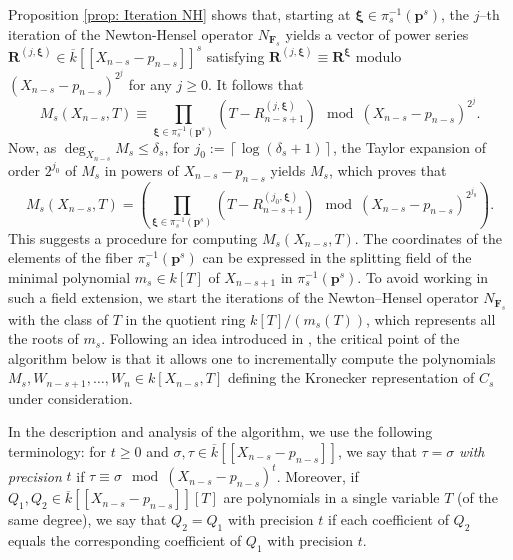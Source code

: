 \documentclass[pdflatex,sn-basic]{sn-jnl}%
\theoremstyle{thmstyleone}%
\theoremstyle{thmstyletwo}%
\theoremstyle{thmstylethree}%
\theoremstyle{definition}
\numberwithin{equation}{section}
\newcommand{\bfs}{\boldsymbol}
\begin{document}
Proposition \ref{prop: Iteration NH} shows that, starting at
$\bfs\xi \in \pi_s^{-1}(\bfs p^s)$, the $j$--th iteration of the
Newton-Hensel operator $N_{\bfs F_s}$ yields a vector of power
series $\bfs R^{(j,\bfs\xi)}\in\overline{k}[\![X_{n-s} - p_{n-s}
]\!]^s$ satisfying $\bfs R^{(j,\bfs\xi)}\equiv\bfs R^{\bfs\xi}$
modulo $(X_{n-s} - p_{n-s})^{2^j}$ for any $j\ge 0$. It follows that
%
$$
M_s(X_{n-s}, T) \equiv \prod_{\bfs\xi \in \pi_s^{-1}(\bfs p^s)} (T -
R_{n-s+1}^{(j,\bfs\xi)})\mod (X_{n-s} -p_{n-s})^{2^j} .$$
%
Now, as $\deg_{X_{n-s}} M_s \le\delta_s$, for $j_0:=\left\lceil \log
(\delta_s+1)\right\rceil$, the Taylor expansion of order $2^{j_0}$ of
$M_s$ in powers of $X_{n-s}-p_{n-s}$ yields $M_s$, which proves that
%
$$M_s(X_{n-s}, T) = \left( \prod_{\bfs\xi \in
\pi_s^{-1}(\bfs p^s)} (T-R_{n-s+1}^{(j_0,\bfs\xi)})\mod (X_{n-s} -
p_{n-s})^{2^{j_0}} \right).$$
%
This suggests a procedure for computing $M_s(X_{n-s},T)$. The
coordinates of the elements of the fiber $\pi_s^{-1}(\bfs p^s)$ can
be expressed in the splitting field of the minimal polynomial
$m_s\in k[T]$ of $X_{n-s+1}$ in $\pi_s^{-1}(\bfs p^s)$. To avoid
working in such a field extension, we start the iterations of the
Newton--Hensel operator $N_{\bfs F_s}$ with the class of $T$ in the
quotient ring $k[T]/(m_s(T))$, which represents all the roots of
$m_s$. Following an idea introduced in \cite[Algorithm 1]{GiLeSa01},
the critical point of the algorithm below is that it allows one to
incrementally compute the polynomials $M_s,W_{n-s+1} ,\ldots,W_n\in
k[X_{n-s},T]$ defining the Kronecker representation of $C_s$ under
consideration.

In the description and analysis of the algorithm, we use the
following terminology: for $t\ge 0$ and $\sigma, \tau \in
\overline{k}[\![X_{n-s} -p_{n-s}]\!]$, we say that $\tau = \sigma$
{\em with precision} $t$ if $\tau \equiv \sigma\mod(X_{n-s} -
p_{n-s})^t$. Moreover, if $Q_1, Q_2 \in \overline{k}[\![X_{n-s}
-p_{n-s}]\!][T]$ are polynomials in a single variable $T$ (of the
same degree), we say that $Q_2 = Q_1$ with precision $t$ if each
coefficient of $Q_2$ equals the corresponding coefficient of $Q_1$
with precision $t$.
\end{document}

